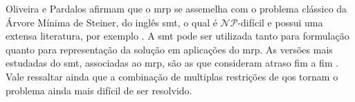 \begin{comment}
O  problema de  construção de  rotas  {\em multicast}  é conhecido  na
literatura como \gls{mrp}. Quando  leva-se em consideração as métricas
de \gls{qos}, o problema resultante é conhecido como \gls{mrp-qos}. No
geral, a diferença principal entre  as várias versões do \gls{mrp-qos}
está na  combinação de  métricas de \gls{qos}  utilizadas e  os custos
associados com a  função objetivo.  Existe uma  dificuldade na geração
de instâncias para  o \gls{mrp-qos} associada com o fato  de que, para
garantir a  existência de pelo menos  uma solução viável, o  valor das
métricas  de  \gls{qos}  devem  ser  suficientes  para  que  todos  os
terminais  sejam  atendidos,  mas  não é  vantajoso  utilizar  valores
folgados  a pontos  de  não  haver dificuldade  para  o modelo.   Para
validar a instâncias e identificar o  impacto do valor das métricas de
\gls{qos}  é possível  utilizar  o \gls{pma}.   Uma  solução ótima  do
\gls{pma} determina quais terminais podem  ser atendidos de acordo com
as métricas  de \gls{qos}  informadas, fazendo  com que  seja possível
adaptar a nova instâncias desconsiderando os terminais não atendidos e
computando  o \gls{mrp-qos}  reduzindo  o conjunto  de terminais  para
apenas os atendidos.

Segundo Peterson \cite{Peterson:2011}, um protocolo fornece um serviço
de comunicação que objetos (nós da  rede) usam para troca de mensagens
e informações.   No caso da  comunicação multicast, os  protocolos são
utilizados  para  enviar  informações  de uma  fonte  para  um  grande
conjunto de  destinos utilizando  apenas uma  operação de  envio.  Uma
parte  essencial   dos  protocolos  de  comunicação   é  o  roteamento
\cite{OLIVEIRA20051953}. Do  ponto de vista matemático,  pode-se ver o
roteamento como  um algoritmo  que manipula os  usuários e  enlaces da
rede, de modo  que os pacotes enviados  por um dos nós  pode seguir um
caminho para o destino utilizando  apenas enlaces selecionados e, caso
existam restrições  de \gls{qos},  deve-se garantir  que todos  os nós
destinos recebem as informações  respeitando os limites impostos pelas
métricas  utilizadas na  rede. Assim,  desenvolver procedimentos  para
construção  de   rotas  otimizadas,   significa  otimizar   também  os
protocolos de comunicação.
\end{comment}

Oliveira e Pardalos \cite{OLIVEIRA20051953} afirmam que o \gls{mrp} se
assemelha  com o  problema clássico  da Árvore  Mínima de  Steiner, do
inglês \gls{smt}, o qual é $\mathcal{NP}$-difícil e possui uma extensa
literatura,    por     exemplo    \cite{Garey:1990,    MACULAN1987185,
  Winter:1987}.  A \gls{smt} pode  ser utilizada tanto para formulação
quanto para representação  da solução em aplicações  do \gls{mrp}.  As
versões mais estudadas  do \gls{smt}, associadas ao  \gls{mrp}, são as
que  consideram  atraso  fim   a  fim  \cite{OLIVEIRA20051953}.   Vale
ressaltar ainda que a combinação  de multiplas restrições de \gls{qos}
tornam o problema ainda mais difícil de ser resolvido.

